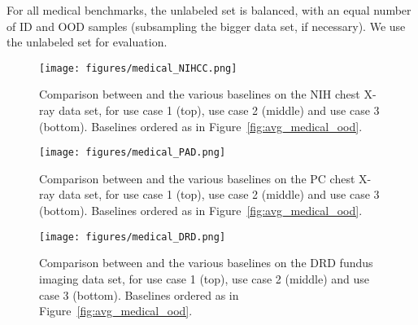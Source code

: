 For all medical benchmarks, the unlabeled set is balanced, with an equal
number of ID and OOD samples (subsampling the bigger data set, if necessary). We
use the unlabeled set for evaluation.

\begin{figure}[H]
  \begin{center}
    \texttt{[image: figures/medical\_NIHCC.png]}
  \end{center}

  \vspace{-0.5cm}
  \caption{Comparison between  and the various baselines on the NIH chest
  X-ray data set, for use case 1 (top), use case 2 (middle) and use case 3
(bottom). Baselines ordered as in Figure~\ref{fig:avg_medical_ood}.}
  \vspace{-0.2cm}

  \label{fig:medical_nih}
\end{figure}

  \vspace{-0.5cm}
\begin{figure}[H]
  \begin{center}
    \texttt{[image: figures/medical\_PAD.png]}
  \end{center}

  \vspace{-0.5cm}
  \caption{Comparison between  and the various baselines on the PC chest
  X-ray data set, for use case 1 (top), use case 2 (middle) and use case 3
(bottom). Baselines ordered as in Figure~\ref{fig:avg_medical_ood}.}
  \vspace{-0.2cm}


  \label{fig:medical_pad}
\end{figure}

\vspace{-0.3cm}
\begin{figure}[H]
  \begin{center}
    \texttt{[image: figures/medical\_DRD.png]}
  \end{center}

  \vspace{-0.5cm}
  \caption{Comparison between  and the various baselines on the DRD fundus
    imaging data set, for use case 1 (top), use case 2 (middle) and use case 3
(bottom). Baselines ordered as in Figure~\ref{fig:avg_medical_ood}.}


  \label{fig:medical_drd}
\end{figure}





